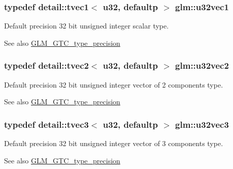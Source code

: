 \subsubsection[{\texorpdfstring{u32vec1}{u32vec1}}]{\setlength{\rightskip}{0pt plus 5cm}typedef detail\+::tvec1$<$ u32, defaultp $>$ {\bf glm\+::u32vec1}}\hypertarget{group__gtc__type__precision_gac8263c8c0bb36bc5c3d109f508e0fb41}{}\label{group__gtc__type__precision_gac8263c8c0bb36bc5c3d109f508e0fb41}
Default precision 32 bit unsigned integer scalar type. \begin{DoxySeeAlso}{See also}
\hyperlink{group__gtc__type__precision}{G\+L\+M\+\_\+\+G\+T\+C\+\_\+type\+\_\+precision} 
\end{DoxySeeAlso}
\subsubsection[{\texorpdfstring{u32vec2}{u32vec2}}]{\setlength{\rightskip}{0pt plus 5cm}typedef detail\+::tvec2$<$ u32, defaultp $>$ {\bf glm\+::u32vec2}}\hypertarget{group__gtc__type__precision_gaa543e17450ca67dee12e2c41badfb3a7}{}\label{group__gtc__type__precision_gaa543e17450ca67dee12e2c41badfb3a7}
Default precision 32 bit unsigned integer vector of 2 components type. \begin{DoxySeeAlso}{See also}
\hyperlink{group__gtc__type__precision}{G\+L\+M\+\_\+\+G\+T\+C\+\_\+type\+\_\+precision} 
\end{DoxySeeAlso}
\subsubsection[{\texorpdfstring{u32vec3}{u32vec3}}]{\setlength{\rightskip}{0pt plus 5cm}typedef detail\+::tvec3$<$ u32, defaultp $>$ {\bf glm\+::u32vec3}}\hypertarget{group__gtc__type__precision_ga7c88634a005904a441cba739d7cc4055}{}\label{group__gtc__type__precision_ga7c88634a005904a441cba739d7cc4055}
Default precision 32 bit unsigned integer vector of 3 components type. \begin{DoxySeeAlso}{See also}
\hyperlink{group__gtc__type__precision}{G\+L\+M\+\_\+\+G\+T\+C\+\_\+type\+\_\+precision} 
\end{DoxySeeAlso}
